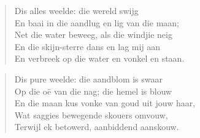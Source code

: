 \begin{verse}
Dis alles weelde: die wereld swijg \\ 
En baai in die aandlug en lig van die maan; \\ 
Net die water beweeg, als die windjie neig \\ 
En die skijn-sterre dans en lag mij aan \\ 
En verbreek op die water en vonkel en staan. \\ 
\end{verse}

\begin{verse}
Dis pure weelde: die aandblom is swaar \\ 
Op die o\"e van die nag; die hemel is blouw \\ 
En die maan kus vonke van goud uit jouw haar, \\ 
Wat saggies bewegende skouers omvouw, \\ 
Terwijl ek betowerd, aanbiddend aanskouw. \\ 
\end{verse}